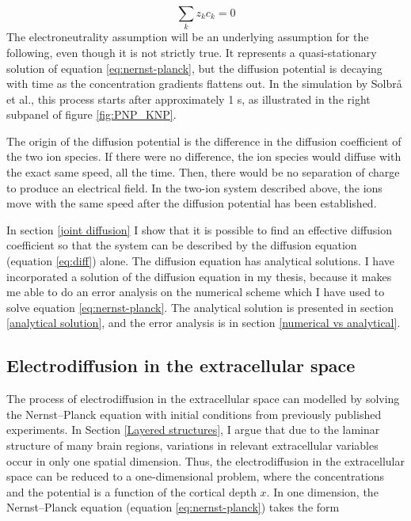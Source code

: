 \documentclass{article}
\begin{document}
$$\sum _k z_k c_k =0$$
The electroneutrality assumption will be an underlying assumption for the following, even though it is not strictly true. It represents a quasi-stationary solution of equation \ref{eq:nernst-planck}, but the diffusion potential is decaying with time as the concentration gradients flattens out. In the simulation by Solbr{\aa} et al., this process starts after approximately 1 s, as illustrated in the right subpanel of figure \ref{fig:PNP_KNP}. 



The origin of the diffusion potential is the difference in the diffusion coefficient of the two ion species. If there were no difference, the ion species would diffuse with the exact same speed, all the time. Then, there would be no separation of charge to produce an electrical field. In the two-ion system described above, the ions move with the same speed after the diffusion potential has been established. 

In section \ref{joint diffusion} I show that  it is possible to find an effective diffusion coefficient so that the system can be described by the diffusion equation (equation  \ref{eq:diff}) alone. 
The diffusion equation has analytical solutions. I have incorporated a solution of the diffusion equation in my thesis, because it makes me able to do an error analysis on the numerical scheme which I have used to solve equation \ref{eq:nernst-planck}. The analytical solution is presented in section \ref{analytical solution}, and the error analysis is in section \ref{numerical vs analytical}.


\subsection{Electrodiffusion in the extracellular space}\label{el.diff in ES}


The process of electrodiffusion in the extracellular space can modelled by solving the Nernst--Planck equation with initial conditions from previously published experiments. In Section \ref{Layered structures}, I argue that due to the laminar structure of many brain regions, variations in relevant extracellular variables occur in only one spatial dimension. Thus, the electrodiffusion in the extracellular space can be reduced to a one-dimensional problem, where the concentrations and the potential is a function of the cortical depth $x$. In one dimension, the Nernst--Planck equation (equation \ref{eq:nernst-planck}) takes the form 
\end{document}
